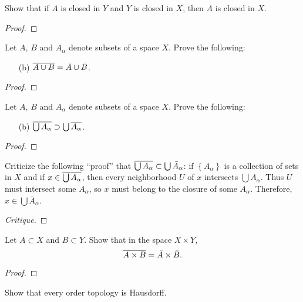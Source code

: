 \begin{problem}[Munkres, \S17, p.\,100, 3]
Show that if $A$ is closed in $Y$ and $Y$ is closed in $X$, then
$A$ is closed in $X$.
\end{problem}
\begin{proof}
\end{proof}
\newpage
\begin{problem}[Munkres, \S17, p.\,101, 6(b)]
Let $A$, $B$ and $A_\alpha$ denote subsets of a space $X$. Prove
the following:
\begin{enumerate}[noitemsep]
\item[(b)] $\overline{A\cup B}=\bar A\cup\bar B$.
\end{enumerate}
\end{problem}
\begin{proof}
\end{proof}
\newpage
\begin{problem}[Munkres, \S17, p.\,101, 6(c)]
Let $A$, $B$ and $A_\alpha$ denote subsets of a space $X$. Prove
the following:
\begin{enumerate}[noitemsep]
\item[(b)] $\overline{\bigcup A_\alpha}\supset\bigcup\overline{A_\alpha}$.
\end{enumerate}
\end{problem}
\begin{proof}
\end{proof}
\newpage
\begin{problem}[Munkres, \S17, p.\,101, 7]
Criticize the following ``proof'' that $\overline{\bigcup
  A_\alpha}\subset\bigcup\bar A_\alpha$: if
$\left\{A_\alpha\right\}$ is a collection of sets in $X$ and if
$x\in\overline{\bigcup A_\alpha}$, then every neighborhood $U$ of $x$
intersects $\bigcup A_\alpha$. Thus $U$ must intersect some
$A_\alpha$, so $x$ must belong to the closure of some
$A_\alpha$. Therefore, $x\in\bigcup\bar A_\alpha$.
\end{problem}
\begin{proof}[Critique]
\end{proof}
\newpage
\begin{problem}[Munkres, \S17, p.\,101, 9]
Let $A\subset X$ and $B\subset Y$. Show that in the space
$X\times Y$,
\[
\overline{A\times B}=\bar A\times\bar B.
\]
\end{problem}
\begin{proof}
\end{proof}
\newpage
\begin{problem}[Munkres, \S17, p.\,101, 10]
Show that every order topology is Hausdorff.
\end{problem}
